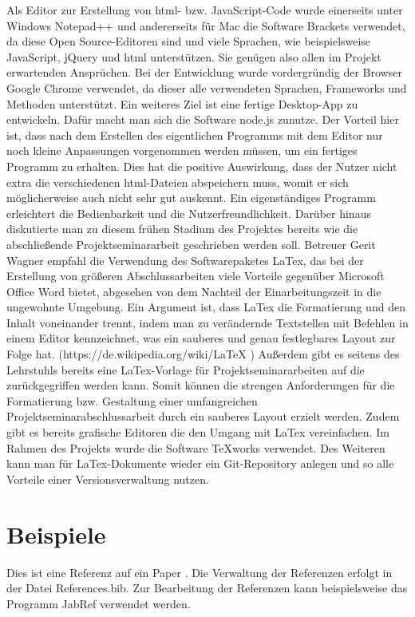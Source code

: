 Als Editor zur Erstellung von html- bzw. JavaScript-Code wurde einerseits unter Windows Notepad++ und andererseits für Mac die Software Brackets verwendet, da diese Open Source-Editoren sind und viele Sprachen, wie beispielsweise JavaScript, jQuery und html unterstützen. Sie genügen also allen im Projekt erwartenden Ansprüchen.
Bei der Entwicklung wurde vordergründig der Browser Google Chrome verwendet, da dieser alle verwendeten Sprachen, Frameworks und Methoden unterstützt. 
Ein weiteres Ziel ist eine fertige Desktop-App zu entwickeln. Dafür macht man sich die Software node.js zunutze. Der Vorteil hier ist, dass nach dem Erstellen des eigentlichen Programms mit dem Editor nur noch kleine Anpassungen vorgenommen werden müssen, um ein fertiges Programm zu erhalten. Dies hat die positive Auswirkung, dass der Nutzer nicht extra die verschiedenen html-Dateien abspeichern muss, womit er sich möglicherweise auch nicht sehr gut auskennt. Ein eigenständiges Programm erleichtert die Bedienbarkeit und die Nutzerfreundlichkeit. 
Darüber hinaus diskutierte man zu diesem frühen Stadium des Projektes bereits wie die abschließende Projektseminararbeit geschrieben werden soll. Betreuer Gerit Wagner empfahl die Verwendung des Softwarepaketes LaTex, das bei der Erstellung von größeren Abschlussarbeiten viele Vorteile gegenüber Microsoft Office Word bietet, abgesehen von dem Nachteil der Einarbeitungszeit in die ungewohnte Umgebung. Ein Argument ist, dass LaTex die Formatierung und den Inhalt voneinander trennt, indem man zu verändernde Textstellen mit Befehlen in einem Editor kennzeichnet, was ein sauberes und genau festlegbares Layout zur Folge hat. (https://de.wikipedia.org/wiki/LaTeX ) Außerdem gibt es seitens des Lehrstuhls bereits eine LaTex-Vorlage für Projektseminararbeiten auf die zurückgegriffen werden kann. Somit können die strengen Anforderungen für die Formatierung bzw. Gestaltung einer umfangreichen Projektseminarabschlussarbeit durch ein sauberes Layout erzielt werden. Zudem gibt es bereits grafische Editoren die den Umgang mit LaTex vereinfachen. Im Rahmen des Projekts wurde die Software TeXworks verwendet. Des Weiteren kann man für LaTex-Dokumente wieder ein Git-Repository anlegen und so alle Vorteile einer Versionsverwaltung nutzen.

\section{Beispiele}
Dies  ist eine Referenz auf ein Paper \cite{Kolter2009}. Die Verwaltung der Referenzen erfolgt in der Datei References.bib. Zur Bearbeitung der Referenzen kann beispielsweise das Programm JabRef verwendet werden.

